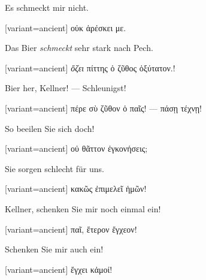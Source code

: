 Es schmeckt mir nicht.

\switchcolumn

\begin{greek}[variant=ancient]%
οὐκ ἀρέσκει με.

\end{greek}%
\switchcolumn*

Das Bier \emph{schmeckt} sehr stark nach Pech.

\switchcolumn

\begin{greek}[variant=ancient]%
\emph{ὄζει} πίττης ὁ ζῦθος ὀξύτατον.!

\end{greek}%
\switchcolumn*

Bier her, Kellner! --- Schleunigst!

\switchcolumn

\begin{greek}[variant=ancient]%
πέρε σὺ ζῦθον ὁ παῖς! --- πάσῃ τέχνῃ!

\end{greek}%
\switchcolumn*

So beeilen Sie sich doch!

\switchcolumn

\begin{greek}[variant=ancient]%
οὐ θᾶττον ἐγκονήσεις;

\end{greek}%
\switchcolumn*

Sie sorgen schlecht für uns.

\switchcolumn

\begin{greek}[variant=ancient]%
κακῶς ἐπιμελεῖ ἡμῶν!

\end{greek}%
\switchcolumn*

Kellner, schenken Sie mir noch einmal ein!

\switchcolumn

\begin{greek}[variant=ancient]%
παῖ, ἕτερον ἔγχεον!

\end{greek}%
\switchcolumn*

Schenken Sie mir auch ein!

\switchcolumn

\begin{greek}[variant=ancient]%
ἔγχει κἀμοί!

\end{greek}%
\switchcolumn*

